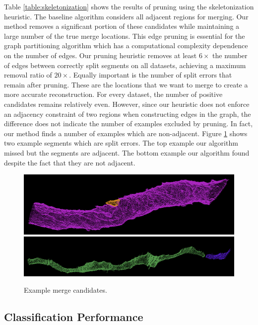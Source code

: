 Table \ref{table:skeletonization} shows the results of pruning using the skeletonization heuristic.
The baseline algorithm considers all adjacent regions for merging. 
Our method removes a significant portion of these candidates while maintaining a large number of the true merge locations.
This edge pruning is essential for the graph partitioning algorithm which has a computational complexity dependence on the number of edges. 
Our pruning heuristic removes at least $6\times$ the number of edges between correctly split segments on all datasets, achieving a maximum removal ratio of $20\times$. 
Equally important is the number of split errors that remain after pruning.
These are the locations that we want to merge to create a more accurate reconstruction.
For every dataset, the number of positive candidates remains relatively even. 
However, since our heuristic does not enforce an adjacency constraint of two regions when constructing edges in the graph, the difference does not indicate the number of examples excluded by pruning. 
In fact, our method finds a number of examples which are non-adjacent.
Figure \ref{fig:skeleton-results} shows two example segments which are split errors.
The top example our algorithm missed but the segments are adjacent. 
The bottom example our algorithm found despite the fact that they are not adjacent.

\begin{figure}[h!]
	\centering
	\includegraphics[width=0.85\linewidth]{./figures/merge_candidate1.png}
	\includegraphics[width=0.85\linewidth]{./figures/merge_candidate2.png}
	\caption{Example merge candidates.}
	\label{fig:skeleton-results}
\end{figure}


\subsection{Classification Performance}

